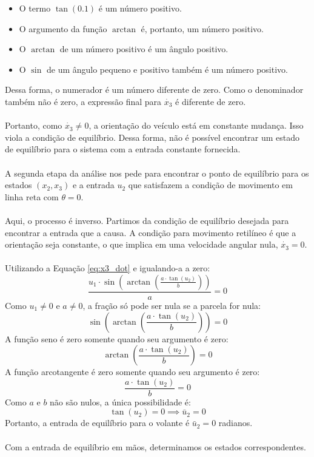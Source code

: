 \documentclass[a4paper,11pt]{article}
\begin{document}
\begin{itemize}
    \item O termo $\tan(0.1)$ é um número positivo.
    \item O argumento da função $\arctan$ é, portanto, um número positivo.
    \item O $\arctan$ de um número positivo é um ângulo positivo.
    \item O $\sin$ de um ângulo pequeno e positivo também é um número positivo.
\end{itemize}
Dessa forma, o numerador é um número diferente de zero. Como o denominador também não é zero, a expressão final para $\dot{x_3}$ é diferente de zero.
\\\\
Portanto, como $\dot{x_3} \neq 0$, a orientação do veículo está em constante mudança. Isso viola a condição de equilíbrio. Dessa forma, não é possível encontrar um estado de equilíbrio para o sistema com a entrada constante fornecida.
\\\\
A segunda etapa da análise nos pede para encontrar o ponto de equilíbrio para os estados $(x_2, x_3)$ e a entrada $u_2$ que satisfazem a condição de movimento em linha reta com $\theta = 0$.
\\\\
Aqui, o processo é inverso. Partimos da condição de equilíbrio desejada para encontrar a entrada que a causa. A condição para movimento retilíneo é que a orientação seja constante, o que implica em uma velocidade angular nula, $\dot{x_3} = 0$.
\\\\
Utilizando a Equação \ref{eq:x3_dot} e igualando-a a zero:
$$ \frac{u_1 \cdot \sin\left(\arctan\left(\frac{a \cdot \tan(u_2)}{b}\right)\right)}{a} = 0 $$
Como $u_1 \neq 0$ e $a \neq 0$, a fração só pode ser nula se a parcela for nula:
$$ \sin\left(\arctan\left(\frac{a \cdot \tan(u_2)}{b}\right)\right) = 0 $$
A função seno é zero somente quando seu argumento é zero:
$$ \arctan\left(\frac{a \cdot \tan(u_2)}{b}\right) = 0 $$
A função arcotangente é zero somente quando seu argumento é zero:
$$ \frac{a \cdot \tan(u_2)}{b} = 0 $$
Como $a$ e $b$ não são nulos, a única possibilidade é:
$$ \tan(u_2) = 0 \implies \bar{u}_2 = 0 $$
Portanto, a entrada de equilíbrio para o volante é $\bar{u}_2 = 0$ radianos.
\\\\
Com a entrada de equilíbrio em mãos, determinamos os estados correspondentes.
\end{document}
